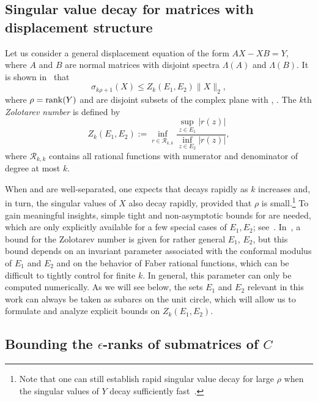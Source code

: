 \documentclass[final,reqno,onefignum,onetabnum]{siamart190516}
\newcommand{ \rank}{{\rm rank}}
\begin{document}
 \subsection{Singular value decay for matrices with displacement structure}
 \label{sec:zolotarev}
 Let us consider a general displacement equation of the form $AX - XB = Y$, where $A$ and $B$ are normal matrices with disjoint spectra $\Lambda(A)$ and $\Lambda(B)$. It is shown in~\cite{Beckermann2019} that 
\begin{equation} 
\label{eq:zolobound_svs}
\sigma_{k \rho + 1}(X) \leq Z_{k}(E_1, E_2) \|X\|_2,
\end{equation}
where $\rho = \rank(Y)$ and  are disjoint subsets of the complex plane with , .
The $k$th \textit{Zolotarev number}  is defined by 
\begin{equation} \label{eq:zolotarev}
 Z_k(E_1,E_2) := \inf_{r\in \mathcal{R}_{k,k}} \frac{\sup_{z \in E_1} |r(z)| }{\inf_{z \in E_2} |r(z)|},
\end{equation}
where $\mathcal{R}_{k,k}$ contains all rational functions with numerator and denominator of degree at most $k$.


When  and  are well-separated,
one expects that  decays rapidly as $k$ increases and, in turn, the singular values of $X$ also decay rapidly, provided that $\rho$ is small.\footnote{Note that one can still establish rapid singular value decay for large $\rho$ when the singular values of $Y$ decay sufficiently fast~\cite{townsend2018singular}.} 
To gain meaningful insights, simple tight and non-asymptotic bounds for  are needed, which are only explicitly available for a few special cases of $E_1,E_2$; see~\cite{Beckermann2019}. In~\cite{rubin2022bounding}, a bound for the Zolotarev number is given for rather general $E_1$, $E_2$, but this bound depends on an invariant parameter associated with the conformal modulus of $E_1$ and $E_2$ and on the behavior of Faber rational functions, which can be difficult to tightly control for finite $k$. In general, this parameter can only be computed numerically. As we will see below, the sets $E_1$ and $E_2$ relevant in this work can always be taken as subarcs on the unit circle, which will allow us to
formulate and analyze explicit bounds on $Z_k(E_1, E_2)$.

\subsection{Bounding the $\epsilon$-ranks of submatrices of $C$} 
\label{sec:bounds}
\end{document}
